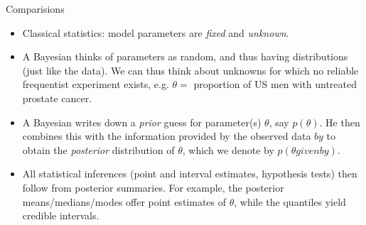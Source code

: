\begin{frame}{Comparisions}
\begin{itemize}\setlength{\itemsep}{0.3cm}

\item Classical statistics: model parameters are \emph{fixed} and \emph{unknown}.

\item A Bayesian thinks of parameters as random, and thus having distributions (just like the data). We can thus think about unknowns for which no reliable frequentist experiment exists, e.g. $\theta =$ proportion of US men with untreated prostate cancer.
		
\item A Bayesian writes down a \emph{prior} guess for parameter(s) $\theta$, say $p(\theta)$. He then combines this with the information provided by the observed data $by$ to obtain the \emph{posterior} distribution of $\theta$, which we denote by $p(\theta given by)$.

\item All statistical inferences (point and interval estimates, hypothesis tests) then follow from posterior summaries. For example, the posterior means/medians/modes offer point estimates of $\theta$, while the quantiles yield credible intervals.

\end{itemize}
\end{frame}

